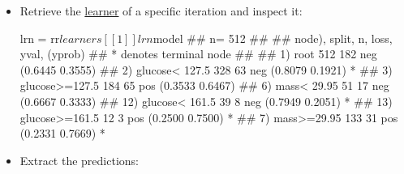\documentclass[12pt,]{scrbook}
\newenvironment{Shaded}{}{}
\newcommand{\DecValTok}[1]{#1}
\newcommand{\KeywordTok}[1]{\textcolor[rgb]{0.00,0.00,1.00}{#1}}
\newcommand{\NormalTok}[1]{#1}
\newcommand{\OperatorTok}[1]{#1}
\newcommand{\StringTok}[1]{\textcolor[rgb]{0.00,0.50,0.50}{#1}}
\begin{document}
\begin{itemize}
\begin{Shaded}
\end{Shaded}
\item
  Retrieve the \protect\hyperlink{learners}{learner} of a specific iteration and inspect it:

\begin{Shaded}
\begin{Highlighting}[]
\NormalTok{lrn =}\StringTok{ }\NormalTok{rr}\OperatorTok{$}\NormalTok{learners[[}\DecValTok{1}\NormalTok{]]}
\NormalTok{lrn}\OperatorTok{$}\NormalTok{model}
\NormalTok{## n= 512 }
\NormalTok{## }
\NormalTok{## node), split, n, loss, yval, (yprob)}
\NormalTok{##       * denotes terminal node}
\NormalTok{## }
\NormalTok{##  1) root 512 182 neg (0.6445 0.3555)  }
\NormalTok{##    2) glucose< 127.5 328  63 neg (0.8079 0.1921) *}
\NormalTok{##    3) glucose>=127.5 184  65 pos (0.3533 0.6467)  }
\NormalTok{##      6) mass< 29.95 51  17 neg (0.6667 0.3333)  }
\NormalTok{##       12) glucose< 161.5 39   8 neg (0.7949 0.2051) *}
\NormalTok{##       13) glucose>=161.5 12   3 pos (0.2500 0.7500) *}
\NormalTok{##      7) mass>=29.95 133  31 pos (0.2331 0.7669) *}
\end{Highlighting}
\end{Shaded}
\item
  Extract the predictions:


\end{itemize}
\end{document}
